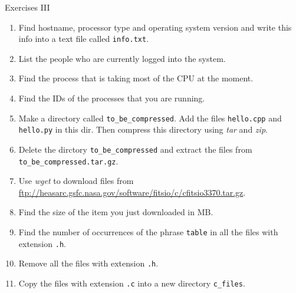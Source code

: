 \documentclass{beamer}
\begin{document}
\begin{frame}{Exercises III}
  \fontsize{8pt}{8}\selectfont
  \begin{enumerate}
    \item Find hostname, processor type and operating system version and write this info into a text file called \texttt{info.txt}.
    \item List the people who are currently logged into the system.
    \item Find the process that is taking most of the CPU at the moment.
    \item Find the IDs of the processes that you are running.
    \item Make a directory called \texttt{to\_be\_compressed}. Add the files \texttt{hello.cpp} and \texttt{hello.py} in this dir.
    Then compress this directory using \textit{tar} and \textit{zip}.
    \item Delete the dirctory \texttt{to\_be\_compressed} and extract the files from \texttt{to\_be\_compressed.tar.gz}.
    \item Use \textit{wget} to download files from \url{ftp://heasarc.gsfc.nasa.gov/software/fitsio/c/cfitsio3370.tar.gz}.
    \item Find the size of the item you just downloaded in MB.
    \item Find the number of occurrences of the phrase \texttt{table} in all the files with extension \texttt{.h}.
    \item Remove all the files with extension \texttt{.h}.
    \item Copy the files with extension \texttt{.c} into a new directory \texttt{c\_files}.
  \end{enumerate}
\end{frame}
\end{document}
